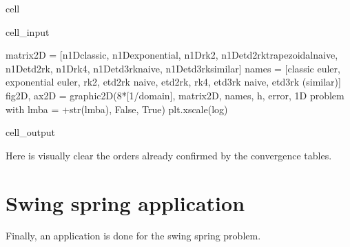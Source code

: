 \documentclass[letterpaper,10pt,english]{jupyterBook}
\begin{document}
\begin{sphinxuseclass}{cell}\begin{sphinxVerbatimInput}

\begin{sphinxuseclass}{cell_input}
\begin{sphinxVerbatim}[commandchars=\\\{\}]
matrix\PYGZus{}2D = [n\PYGZus{}1D\PYGZus{}classic, n\PYGZus{}1D\PYGZus{}exponential, n\PYGZus{}1D\PYGZus{}rk2, n\PYGZus{}1D\PYGZus{}etd2rk\PYGZus{}trapezoidal\PYGZus{}naive, n\PYGZus{}1D\PYGZus{}etd2rk, n\PYGZus{}1D\PYGZus{}rk4, n\PYGZus{}1D\PYGZus{}etd3rk\PYGZus{}naive, n\PYGZus{}1D\PYGZus{}etd3rk\PYGZus{}similar]
names = [\PYGZsq{}classic euler\PYGZsq{}, \PYGZsq{}exponential euler\PYGZsq{}, \PYGZsq{}rk2\PYGZsq{}, \PYGZsq{}etd2rk naive\PYGZsq{}, \PYGZsq{}etd2rk\PYGZsq{}, \PYGZsq{}rk4\PYGZsq{}, \PYGZsq{}etd3rk naive\PYGZsq{}, \PYGZdq{}etd3rk (similar)\PYGZdq{}]
fig\PYGZus{}2D, ax\PYGZus{}2D = graphic\PYGZus{}2D(8*[1/domain], matrix\PYGZus{}2D, names, \PYGZdq{}h\PYGZdq{}, \PYGZdq{}error\PYGZdq{}, \PYGZdq{}1D problem with lmba = \PYGZdq{}+str(lmba), False, True)
plt.xscale(\PYGZsq{}log\PYGZsq{})
\end{sphinxVerbatim}

\end{sphinxuseclass}\end{sphinxVerbatimInput}
\begin{sphinxVerbatimOutput}

\begin{sphinxuseclass}{cell_output}
\noindent{}

\end{sphinxuseclass}\end{sphinxVerbatimOutput}

\end{sphinxuseclass}
\sphinxAtStartPar
Here is visually clear the orders already confirmed by the convergence tables.

\sphinxstepscope


\section{Swing spring application}
\label{\detokenize{cap5:swing-spring-application}}\label{\detokenize{cap5::doc}}
\sphinxAtStartPar
Finally, an application is done for the swing spring problem.
\end{document}
